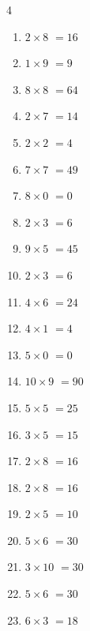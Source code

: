 \begin{multicols}{4}
\begin{enumerate}
  \item $2\times 8$
        $=16$

  \item $1\times 9$
        $=9$

  \item $8\times 8$
        $=64$

  \item $2\times 7$
        $=14$

  \item $2\times 2$
        $=4$

  \item $7\times 7$
        $=49$

  \item $8\times 0$
        $=0$

  \item $2\times 3$
        $=6$

  \item $9\times 5$
        $=45$

  \item $2\times 3$
        $=6$

  \item $4\times 6$
        $=24$

  \item $4\times 1$
        $=4$

  \item $5\times 0$
        $=0$

  \item $10\times 9$
        $=90$

  \item $5\times 5$
        $=25$

  \item $3\times 5$
        $=15$

  \item $2\times 8$
        $=16$

  \item $2\times 8$
        $=16$

  \item $2\times 5$
        $=10$

  \item $5\times 6$
        $=30$

  \item $3\times 10$
        $=30$

  \item $5\times 6$
        $=30$

  \item $6\times 3$
        $=18$


\end{enumerate}
\end{multicols}
